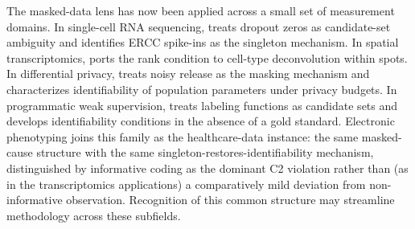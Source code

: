 The masked-data lens has now been applied across a small set of
measurement domains.
In single-cell RNA sequencing, \citet{towell2026scrnacoarsening} treats
dropout zeros as candidate-set ambiguity and identifies ERCC
spike-ins as the singleton mechanism. In spatial transcriptomics,
\citet{towell2026spatialcoarsening} ports the rank condition to
cell-type deconvolution within spots. In differential privacy,
\citet{towell2026dpcoarsening} treats noisy release as the masking
mechanism and characterizes identifiability of population parameters
under privacy budgets. In programmatic weak supervision,
\citet{towell2026weaksupcoarsening} treats labeling functions as
candidate sets and develops identifiability conditions in the absence
of a gold standard. Electronic phenotyping joins this family as the
healthcare-data instance: the same masked-cause structure with the
same singleton-restores-identifiability mechanism, distinguished by
informative coding as the dominant C2 violation rather than (as in
the transcriptomics applications) a comparatively mild deviation from
non-informative observation. Recognition of this common structure may
streamline methodology across these subfields.
